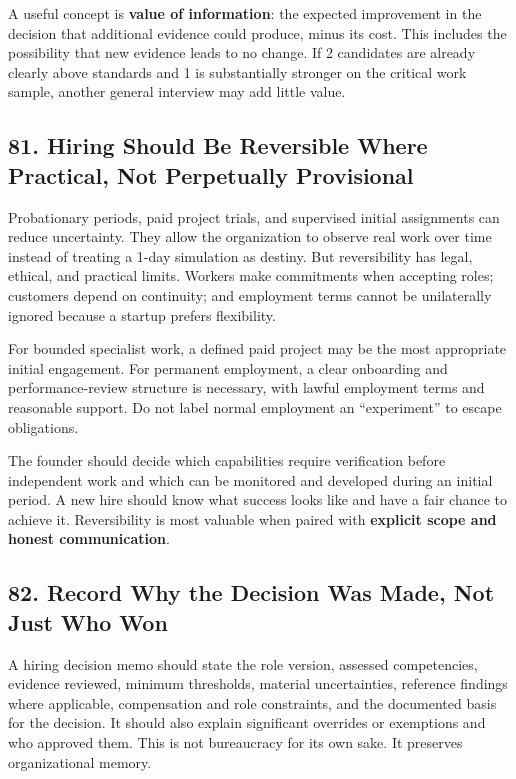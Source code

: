 A useful concept is \textbf{value of information}: the expected improvement in the decision that additional evidence could produce, minus its cost. This includes the possibility that new evidence leads to no change. If 2 candidates are already clearly above standards and 1 is substantially stronger on the critical work sample, another general interview may add little value.

\subsection*{81. Hiring Should Be Reversible Where Practical, Not Perpetually Provisional}

Probationary periods, paid project trials, and supervised initial assignments can reduce uncertainty. They allow the organization to observe real work over time instead of treating a 1-day simulation as destiny. But reversibility has legal, ethical, and practical limits. Workers make commitments when accepting roles; customers depend on continuity; and employment terms cannot be unilaterally ignored because a startup prefers flexibility.

For bounded specialist work, a defined paid project may be the most appropriate initial engagement. For permanent employment, a clear onboarding and performance-review structure is necessary, with lawful employment terms and reasonable support. Do not label normal employment an ``experiment'' to escape obligations.

The founder should decide which capabilities require verification before independent work and which can be monitored and developed during an initial period. A new hire should know what success looks like and have a fair chance to achieve it. Reversibility is most valuable when paired with \textbf{explicit scope and honest communication}.

\subsection*{82. Record Why the Decision Was Made, Not Just Who Won}

A hiring decision memo should state the role version, assessed competencies, evidence reviewed, minimum thresholds, material uncertainties, reference findings where applicable, compensation and role constraints, and the documented basis for the decision. It should also explain significant overrides or exemptions and who approved them. This is not bureaucracy for its own sake. It preserves organizational memory.

